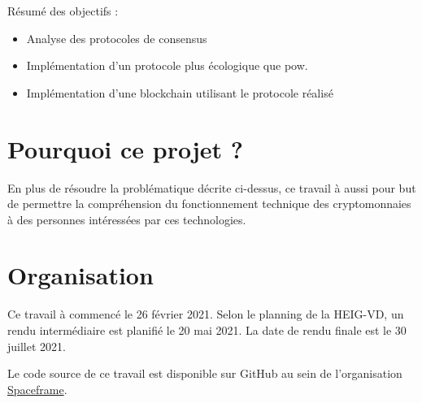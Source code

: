 Résumé des objectifs :
\begin{itemize}
    \item Analyse des protocoles de consensus
    \item Implémentation d'un protocole plus écologique que \gls{pow}.
    \item Implémentation d'une blockchain utilisant le protocole réalisé
\end{itemize}

\section{Pourquoi ce projet ?}

En plus de résoudre la problématique décrite ci-dessus, ce travail à aussi pour but de permettre la compréhension du fonctionnement technique des cryptomonnaies à des personnes intéressées par ces technologies.

\section{Organisation}

Ce travail à commencé le 26 février 2021.
Selon le planning de la HEIG-VD, un rendu intermédiaire est planifié le 20 mai 2021. La date de rendu finale est le 30 juillet 2021.

Le code source de ce travail est disponible sur GitHub au sein de l'organisation \href{https://github.com/spaceframeos}{Spaceframe}.